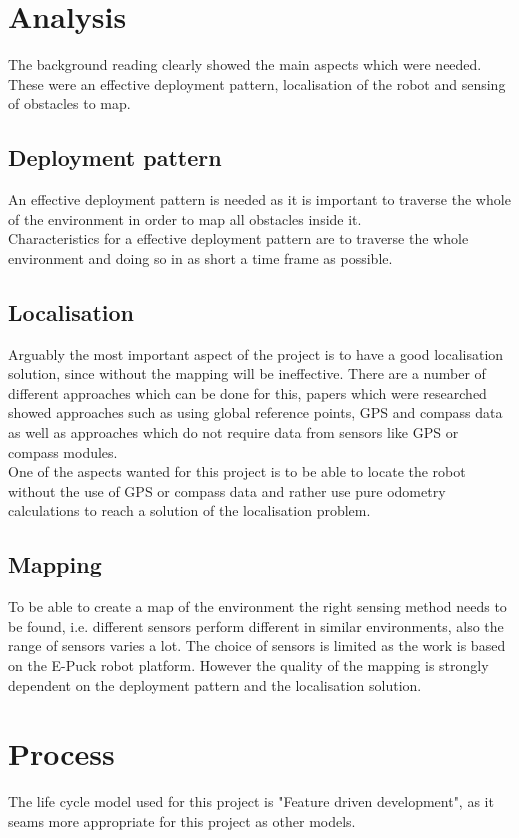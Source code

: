 \begin{flushleft}
\section{Analysis}
The background reading clearly showed the main aspects which were needed.\\
These were an effective deployment pattern, localisation of the robot and sensing of obstacles to map. 

\subsection{Deployment pattern}
An effective deployment pattern is needed as it is important to traverse the whole of the environment in order to map all obstacles inside it.\\
Characteristics for a effective deployment pattern are to traverse the whole environment and doing so in as short a time frame as possible.

\subsection{Localisation}
Arguably the most important aspect of the project is to have a good localisation solution, since without the mapping will be ineffective. There are a number of different approaches which can be done for this, papers which were researched showed approaches such as using global reference points, GPS and compass data as well as approaches which do not require data from sensors like GPS or compass modules.\\
One of the aspects wanted for this project is to be able to locate the robot without the use of GPS or compass data and rather use pure odometry calculations to reach a solution of the localisation problem.

\subsection{Mapping}
To be able to create a map of the environment the right sensing method needs to be found, i.e. different sensors perform different in similar environments, also the range of sensors varies a lot. 
The choice of sensors is limited as the work is based on the E-Puck robot platform.
However the quality of the mapping is strongly dependent on the deployment pattern and the localisation solution.

\section{Process}
The life cycle model used for this project is "Feature driven development", as it seams more appropriate for this project as other models. 

\end{flushleft}
